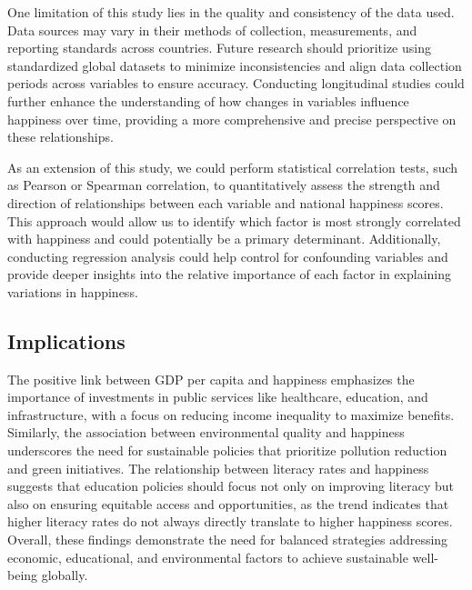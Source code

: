 \documentclass[
]{article}
\begin{document}
One limitation of this study lies in the quality and consistency of the
data used. Data sources may vary in their methods of collection,
measurements, and reporting standards across countries. Future research
should prioritize using standardized global datasets to minimize
inconsistencies and align data collection periods across variables to
ensure accuracy. Conducting longitudinal studies could further enhance
the understanding of how changes in variables influence happiness over
time, providing a more comprehensive and precise perspective on these
relationships.

As an extension of this study, we could perform statistical correlation
tests, such as Pearson or Spearman correlation, to quantitatively assess
the strength and direction of relationships between each variable and
national happiness scores. This approach would allow us to identify
which factor is most strongly correlated with happiness and could
potentially be a primary determinant. Additionally, conducting
regression analysis could help control for confounding variables and
provide deeper insights into the relative importance of each factor in
explaining variations in happiness.

\hypertarget{implications}{%
\subsection{Implications}\label{implications}}

The positive link between GDP per capita and happiness emphasizes the
importance of investments in public services like healthcare, education,
and infrastructure, with a focus on reducing income inequality to
maximize benefits. Similarly, the association between environmental
quality and happiness underscores the need for sustainable policies that
prioritize pollution reduction and green initiatives. The relationship
between literacy rates and happiness suggests that education policies
should focus not only on improving literacy but also on ensuring
equitable access and opportunities, as the trend indicates that higher
literacy rates do not always directly translate to higher happiness
scores. Overall, these findings demonstrate the need for balanced
strategies addressing economic, educational, and environmental factors
to achieve sustainable well-being globally.
\end{document}
